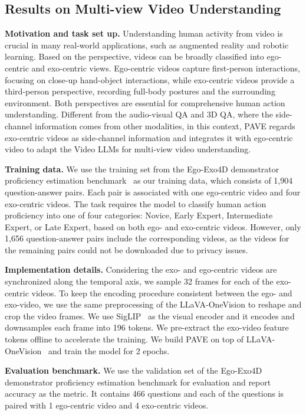 \subsection{Results on Multi-view Video Understanding} \label{section_res_multi_view_video}
\noindent\textbf{Motivation and task set up.}
Understanding human activity from video is crucial in many real-world applications, such as augmented reality and robotic learning. Based on the perspective, videos can be broadly classified into ego-centric and exo-centric views. Ego-centric videos capture first-person interactions, focusing on close-up hand-object interactions, while exo-centric videos provide a third-person perspective, recording full-body postures and the surrounding environment. Both perspectives are essential for comprehensive human action understanding. 
Different from the audio-visual QA and 3D QA, where the side-channel information comes from other modalities, in this context, PAVE regards exo-centric videos as side-channel information and integrates it with ego-centric video to adapt the Video LLMs for multi-view video understanding.

\medskip
\noindent\textbf{Training data.} 
We use the training set from the Ego-Exo4D demonstrator proficiency estimation benchmark~\cite{grauman2024ego} as our training data, which consists of 1,904 question-answer pairs. Each pair is associated with one ego-centric video and four exo-centric videos. The task requires the model to classify human action proficiency into one of four categories: Novice, Early Expert, Intermediate Expert, or Late Expert, based on both ego- and exo-centric videos. However, only 1,656 question-answer pairs include the corresponding videos, as the videos for the remaining pairs could not be downloaded due to privacy issues.


\medskip
\noindent\textbf{Implementation details.}
Considering the exo- and ego-centric videos are synchronized along the temporal axis, we sample 32 frames for each of the exo-centric videos. To keep the encoding procedure consistent between the ego- and exo-video, we use the same preprocessing of the LLaVA-OneVision to reshape and crop the video frames. We use SigLIP~\cite{zhai2023sigmoidlosslanguageimage} as the visual encoder and it encodes and downsamples each frame into 196 tokens. We pre-extract the exo-video feature tokens offline to accelerate the training. 
We build PAVE on top of LLaVA-OneVision~\cite{li2024llava} and train the model for 2 epochs.


\medskip
\noindent\textbf{Evaluation benchmark.} 
We use the validation set of the Ego-Exo4D~\cite{grauman2024ego} demonstrator proficiency estimation benchmark for evaluation and report accuracy as the metric. It contains 466 questions and each of the questions is paired with 1 ego-centric video and 4 exo-centric videos.

